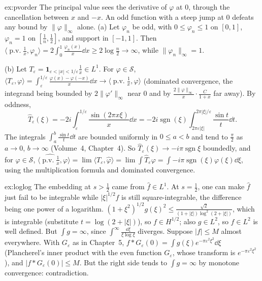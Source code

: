 \begin{solution}{ex:pvorder}
\idea The principal value sees the derivative of $\varphi$ at $0$, through the cancellation between $x$ and $-x$. An odd function with a steep jump at $0$ defeats any bound by $\|\varphi\|_\infty$ alone.
\writeup (a) Let $\varphi_n$ be odd, with $0\le\varphi_n\le1$ on $[0,1]$, $\varphi_n=1$ on $[\frac1n,\frac12]$, and support in $[-1,1]$. Then $\langle\operatorname{p.v.}\frac1x,\varphi_n\rangle=2\int_0^1\frac{\varphi_n(x)}x\dd x\ge2\log\frac n2\to\infty$, while
$\|\varphi_n\|_\infty=1$.

(b) Let $T_\varepsilon=\mathbf 1_{\varepsilon<|x|<1/\varepsilon}\frac1x\in L^1$. For $\varphi\in\mathcal S$, $\langle T_\varepsilon,\varphi\rangle=\int_\varepsilon^{1/\varepsilon}\frac{\varphi(x)-\varphi(-x)}x\dd x\to\langle\operatorname{p.v.}\frac1x,\varphi\rangle$ (dominated convergence, the
integrand being bounded by $2\|\varphi'\|_\infty$ near $0$ and by $\frac{2\|\varphi\|_\infty}x\cdot\frac{C}{1+x}$ far away). By oddness,
\[\hat T_\varepsilon(\xi)=-2i\int_\varepsilon^{1/\varepsilon}\frac{\sin(2\pi x\xi)}x\dd x=-2i\operatorname{sgn}(\xi)\int_{2\pi\varepsilon|\xi|}^{2\pi|\xi|/\varepsilon}\frac{\sin t}t\dd t.\]
The integrals $\int_a^b\frac{\sin t}t\dd t$ are bounded uniformly in $0\le a<b$ and tend to $\frac\pi2$ as $a\to0$, $b\to\infty$ (Volume~4, Chapter~4). So $\hat T_\varepsilon(\xi)\to-i\pi\operatorname{sgn}\xi$ boundedly, and for
$\varphi\in\mathcal S$, $\langle\widehat{\operatorname{p.v.}\frac1x},\varphi\rangle=\lim\langle T_\varepsilon,\hat\varphi\rangle=\lim\int\hat T_\varepsilon\varphi=\int-i\pi\operatorname{sgn}(\xi)\varphi(\xi)\dd\xi$, using the multiplication formula and dominated convergence.
\end{solution}

\begin{solution}{ex:loglog}
\idea The embedding at $s>\frac12$ came from $\hat f\in L^1$. At $s=\frac12$, one can make $\hat f$ just fail to be integrable while $|\xi|^{1/2}\hat f$ is still square-integrable, the difference being one power of a
logarithm.
\writeup $(1+\xi^2)^{1/2}g(\xi)^2\le\frac{\sqrt2}{(1+|\xi|)\log^2(2+|\xi|)}$, which is integrable (substitute $t=\log(2+|\xi|)$), so $f\in H^{1/2}$; also $g\in L^2$, so $f\in L^2$ is well defined. But $\int g=\infty$, since
$\int^\infty\frac{\dd\xi}{\xi\log\xi}$ diverges. Suppose $|f|\le M$ almost everywhere. With $G_\varepsilon$ as in Chapter~5, $f*G_\varepsilon(0)=\int g(\xi)e^{-\pi\varepsilon^2\xi^2}\dd\xi$ (Plancherel's inner product with the even function $G_\varepsilon$,
whose transform is $e^{-\pi\varepsilon^2\xi^2}$), and $|f*G_\varepsilon(0)|\le M$. But the right side tends to $\int g=\infty$ by monotone convergence: contradiction.
\end{solution}

